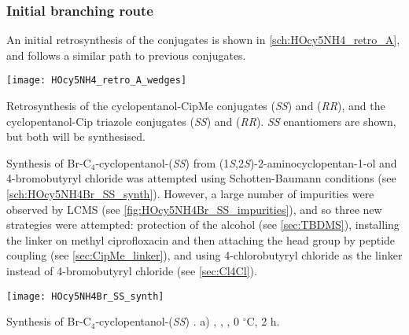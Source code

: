 \subsubsection{Initial branching route\label{sec:init_branch}}

An initial retrosynthesis of the conjugates is shown in \ref{sch:HOcy5NH4_retro_A}, and follows a similar path to previous conjugates.

\begin{scheme}[H]
	\begin{center}
		\texttt{[image: HOcy5NH4\_retro\_A\_wedges]}
		\caption{Retrosynthesis of the cyclopentanol-CipMe conjugates 
		 (\textit{SS}) and 
		 (\textit{RR}),
		and the cyclopentanol-Cip triazole conjugates 
		 (\textit{SS}) and   (\textit{RR}). 
		\textit{SS} enantiomers are shown, but both will be synthesised. \label{sch:HOcy5NH4_retro_A}}
	\end{center}
\end{scheme}

Synthesis of Br-C$_4$-cyclopentanol-(\textit{SS})  from (1\textit{S},2\textit{S})-2-aminocyclopentan-1-ol  and 4-bromobutyryl chloride  was attempted using Schotten-Baumann conditions (see \ref{sch:HOcy5NH4Br_SS_synth}). However, a large number of impurities were observed by LCMS (see \ref{fig:HOcy5NH4Br_SS_impurities}), and so three new strategies were attempted: protection of the alcohol (see \ref{sec:TBDMS}), installing the linker on methyl ciprofloxacin  and then attaching the head group by peptide coupling (see \ref{sec:CipMe_linker}), and using 4-chlorobutyryl chloride  as the linker instead of 4-bromobutyryl chloride  (see \ref{sec:Cl4Cl}).


\begin{scheme}[H]
	\begin{center}
		\texttt{[image: HOcy5NH4Br\_SS\_synth]}
		\caption{Synthesis of Br-C$_4$-cyclopentanol-(\textit{SS}) .
		a) , , , 0 $^{\circ}$C, 2 h. \label{sch:HOcy5NH4Br_SS_synth}}
	\end{center}
\end{scheme}

